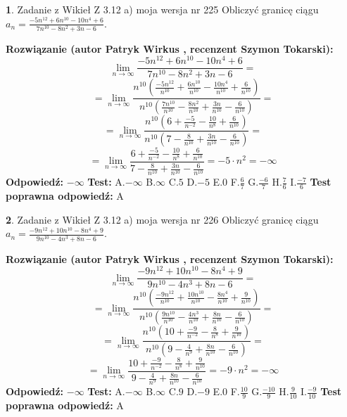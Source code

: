\documentclass[12pt, a4paper]{article}
\theoremstyle{definition} %
\newtheorem{zad}{}
\newcommand{\zadStart}[1]{\begin{zad}#1\newline}
\newcommand{\zadStop}{\end{zad}}
\newcommand{\rozwStart}[2]{\noindent \textbf{Rozwiązanie (autor #1 , recenzent #2): }\newline}
\newcommand{\rozwStop}{\newline}
\newcommand{\odpStart}{\noindent \textbf{Odpowiedź:}\newline}
\newcommand{\odpStop}{\newline}
\newcommand{\testStart}{\noindent \textbf{Test:}\newline}
\newcommand{\testStop}{\newline}
\newcommand{\kluczStart}{\noindent \textbf{Test poprawna odpowiedź:}\newline}
\newcommand{\kluczStop}{\newline}
\begin{document}
\zadStart{Zadanie z Wikieł Z 3.12 a) moja wersja nr 225}
Obliczyć granicę ciągu $a_{n}=\frac{-5n^{12}+6n^{10}-10n^{4}+6}{7n^{10}-8n^{2}+3n-6}$.
\zadStop
\rozwStart{Patryk Wirkus}{Szymon Tokarski}
$$\lim\limits_{n\to\infty}\frac{-5n^{12}+6n^{10}-10n^{4}+6}{7n^{10}-8n^{2}+3n-6}=$$
$$=\lim\limits_{n\to\infty}\frac{n^{10}\left(\frac{-5n^{12}}{n^{10}}+\frac{6n^{10}}{n^{10}}-\frac{10n^{4}}{n^{10}}+\frac{6}{n^{10}}\right)}{n^{10}\left(\frac{7n^{10}}{n^{10}}-\frac{8n^{2}}{n^{10}}+\frac{3n}{n^{10}}-\frac{6}{n^{10}}\right)}=$$
$$=\lim\limits_{n\to\infty}\frac{n^{10}\left(6+\frac{-5}{n^{-2}}-\frac{10}{n^{8}}+\frac{6}{n^{10}}\right)}
{n^{10}\left(7-\frac{8}{n^{10}}+\frac{3n}{n^{10}}-\frac{6}{n^{10}}\right)}=$$
$$=\lim\limits_{n\to\infty}\frac{6+\frac{-5}{n^{-2}}-\frac{10}{n^{8}}+\frac{6}{n^{10}}}{7-\frac{8}{n^{10}}+\frac{3n}{n^{10}}-\frac{6}{n^{10}}}=-5\cdot n^{2} = -\infty$$
\rozwStop
\odpStart
$-\infty$
\odpStop
\testStart
A.$-\infty$
B.$\infty$
C.$5$
D.$-5$
E.$0$
F.$\frac{6}{7}$
G.$\frac{-6}{7}$
H.$\frac{7}{6}$
I.$\frac{-7}{6}$
\testStop
\kluczStart
A
\kluczStop



\zadStart{Zadanie z Wikieł Z 3.12 a) moja wersja nr 226}
Obliczyć granicę ciągu $a_{n}=\frac{-9n^{12}+10n^{10}-8n^{4}+9}{9n^{10}-4n^{3}+8n-6}$.
\zadStop
\rozwStart{Patryk Wirkus}{Szymon Tokarski}
$$\lim\limits_{n\to\infty}\frac{-9n^{12}+10n^{10}-8n^{4}+9}{9n^{10}-4n^{3}+8n-6}=$$
$$=\lim\limits_{n\to\infty}\frac{n^{10}\left(\frac{-9n^{12}}{n^{10}}+\frac{10n^{10}}{n^{10}}-\frac{8n^{4}}{n^{10}}+\frac{9}{n^{10}}\right)}{n^{10}\left(\frac{9n^{10}}{n^{10}}-\frac{4n^{3}}{n^{10}}+\frac{8n}{n^{10}}-\frac{6}{n^{10}}\right)}=$$
$$=\lim\limits_{n\to\infty}\frac{n^{10}\left(10+\frac{-9}{n^{-2}}-\frac{8}{n^{8}}+\frac{9}{n^{10}}\right)}
{n^{10}\left(9-\frac{4}{n^{9}}+\frac{8n}{n^{10}}-\frac{6}{n^{10}}\right)}=$$
$$=\lim\limits_{n\to\infty}\frac{10+\frac{-9}{n^{-2}}-\frac{8}{n^{8}}+\frac{9}{n^{10}}}{9-\frac{4}{n^{9}}+\frac{8n}{n^{10}}-\frac{6}{n^{10}}}=-9\cdot n^{2} = -\infty$$
\rozwStop
\odpStart
$-\infty$
\odpStop
\testStart
A.$-\infty$
B.$\infty$
C.$9$
D.$-9$
E.$0$
F.$\frac{10}{9}$
G.$\frac{-10}{9}$
H.$\frac{9}{10}$
I.$\frac{-9}{10}$
\testStop
\kluczStart
A
\kluczStop
\end{document}
